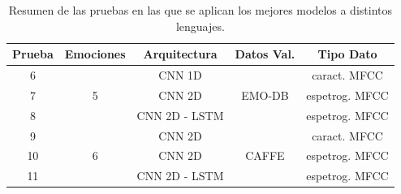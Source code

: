\documentclass[11pt,a4paper,spanish]{book}
\begin{document}
	\begin{table}[H]
		\centering
		\begin{center}
			\begin{tabular}{| c | c | c | c | c |}
				\hline
				\textbf{Prueba} &
				\textbf{Emociones}& 
				\textbf{Arquitectura} & 
				\textbf{Datos Val.} & 
				\textbf{Tipo Dato} \\ 
				\hline\hline
				6 & \multirow{3}{*}{5} & CNN 1D & \multirow{3}{*}{EMO-DB} & caract. MFCC\\ 
				7 &  & CNN 2D &  & espetrog. MFCC\\ 
				8 &  & CNN 2D - LSTM &  & espetrog. MFCC\\ \hline
				9 & \multirow{3}{*}{6} & CNN 2D & \multirow{3}{*}{CAFFE} & caract. MFCC\\  
				10 &  & CNN 2D &  & espetrog. MFCC\\ 
				11 &  & CNN 2D - LSTM &  & espetrog. MFCC\\
				\hline
				
			\end{tabular}
			
			\caption{Resumen de las pruebas en las que se aplican los mejores modelos a distintos lenguajes.}
			\label{tab:resumenTests2}
		\end{center}
	\end{table}
	
	
	
	

		
		
		

	
	
	
		\printbibliography
	
\end{document}
